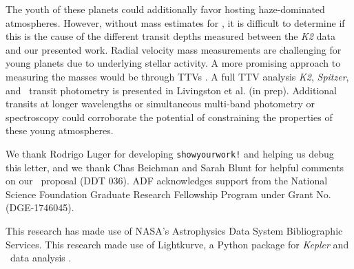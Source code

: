 \documentclass[linenumbers,modern,twocolumn]{aastex631}
\begin{document}
The youth of these planets could additionally favor hosting haze-dominated atmospheres. However, without mass estimates for \allplanets, it is difficult to determine if this is the cause of the different transit depths measured between the \textit{K2} data and our presented work. Radial velocity mass measurements are challenging for young planets due to underlying stellar activity. A more promising approach to measuring the masses would be through TTVs \citep{agol18}. A full TTV analysis \textit{K2}, \textit{Spitzer}, and \tess\ transit photometry is presented in Livingston et al. (in prep). Additional transits at longer wavelengths or simultaneous multi-band photometry or spectroscopy could corroborate the potential of constraining the properties of these young atmospheres.


\begin{acknowledgments}
We thank Rodrigo Luger for developing \texttt{showyourwork!} \citep{luger21} and helping us debug this letter, and we thank Chas Beichman and Sarah Blunt for helpful comments on our \tess\ proposal (DDT 036). ADF acknowledges support from the National Science Foundation Graduate Research Fellowship Program under Grant No. (DGE-1746045).

This research has made use of NASA's Astrophysics Data System Bibliographic Services. This research made use of Lightkurve, a Python package for \textit{Kepler} and \tess\ data analysis \citep{lightkurve}.

\end{acknowledgments}
\end{document}
